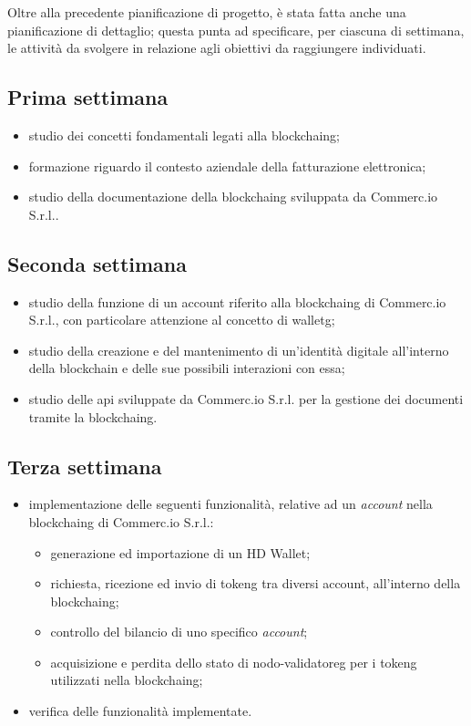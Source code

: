 Oltre alla precedente pianificazione di progetto, è stata fatta anche una pianificazione di dettaglio; questa punta ad specificare, per ciascuna di settimana, le attività da svolgere in relazione agli obiettivi da raggiungere individuati.

\subsection*{Prima settimana}
\begin{itemize}
	\item studio dei concetti fondamentali legati alla \gls{blockchaing};
	\item formazione riguardo il contesto aziendale della fatturazione elettronica;
	\item studio della documentazione della \gls{blockchaing} sviluppata da Commerc.io S.r.l..
\end{itemize}

\subsection*{Seconda settimana} 
\begin{itemize}
	\item studio della funzione di un account riferito alla \gls{blockchaing} di Commerc.io S.r.l., con particolare attenzione al concetto di \gls{walletg}\glsfirstoccur;
	\item studio della creazione e del mantenimento di un'identità digitale all'interno della blockchain e delle sue possibili interazioni con essa;
	\item studio delle \gls{api} sviluppate da Commerc.io S.r.l. per la gestione dei documenti tramite la \gls{blockchaing}.
\end{itemize}

\subsection*{Terza settimana}
\begin{itemize}
	\item implementazione delle seguenti funzionalità, relative ad un \textit{account} nella \gls{blockchaing} di Commerc.io S.r.l.:
	\begin{itemize}
		\item generazione ed importazione di un HD Wallet;
		\item richiesta, ricezione ed invio di \gls{tokeng}\glsfirstoccur{} tra diversi account, all'interno della \gls{blockchaing};
		\item controllo del bilancio di uno specifico \textit{account};
		\item acquisizione e perdita dello stato di \gls{nodo-validatoreg}\glsfirstoccur{} per i \gls{tokeng} utilizzati nella \gls{blockchaing};
	\end{itemize}
	\item verifica delle funzionalità implementate.
\end{itemize}

